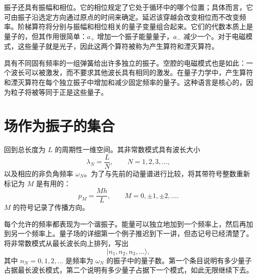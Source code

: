 振子还具有振幅和相位。它的相位规定了它处于循环中的哪个位置；具体而言，它可由振子沿选定方向通过原点的时间来确定。延迟该穿越会改变相位而不改变频率。阶梯算符将分别与振幅和相位相关的量子变量组合起来。它们的代数本质上是量子的，但其作用很简单：\(a_+\) 增加一个振子能量量子，\(a_-\) 减少一个。对于电磁模式，这些量子就是光子，因此这两个算符被称为产生算符和湮灭算符。

\begin{classroomqa}
\end{classroomqa}

具有不同固有频率的一组弹簧给出许多独立的振子。空腔的电磁模式也是如此：一个波长可以被激发，而不要求其他波长具有相同的激发。在量子力学中，产生算符和湮灭算符在每个独立振子中增加和减少固定频率的量子。这种语言是核心的，因为粒子将被等同于正是这些量子。

\section{场作为振子的集合}

回到总长度为 \(L\) 的周期性一维空间。其非常数模式具有波长大小
\begin{equation}
\lambda_N=\frac{L}{N},
\qquad N=1,2,3,\ldots ,
\end{equation}
以及相应的非负角频率 \(\omega_N\)。为了与先前的动量谱进行比较，将其带符号整数重新标记为 \(M\) 是有用的：
\begin{equation}
p_M=\frac{Mh}{L},
\qquad M=0,\pm1,\pm2,\ldots .
\end{equation}
\(M\) 的符号记录了传播方向。

每个允许的频率都表现为一个谐振子。能量可以独立地加到一个频率上，然后再加到另一个频率上。量子场的详细第一个例子推迟到下一讲，但态记号已经清楚了。将非常数模式从最长波长向上排列，写出
\begin{equation}
|n_1,n_2,n_3,\ldots\rangle,
\end{equation}
其中 \(n_N=0,1,2,\ldots\) 是频率为 \(\omega_N\) 的振子中的量子数。第一个条目说明有多少量子占据最长波长模式，第二个说明有多少量子占据下一个模式，如此无限继续下去。

